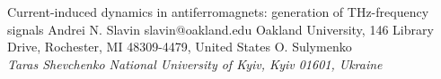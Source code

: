 \begin{conf-abstract}[]
{Current-induced dynamics in antiferromagnets: generation of THz-frequency signals}
{\color{blue} Andrei N. Slavin}
{slavin@oakland.edu}
{Oakland University, 146 Library Drive, Rochester, MI  48309-4479, United States}
{{\color{blue}O. Sulymenko}\\ \textit{Taras Shevchenko National University of Kyiv, Kyiv 01601, Ukraine}\\ 
\decofourleft \decofourright}





\printbibliography[heading=none]

\end{conf-abstract}
